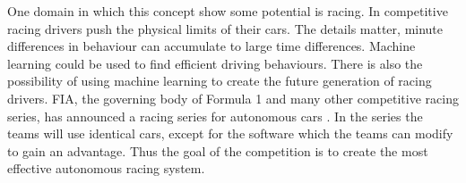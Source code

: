 One domain in which this concept show some potential is racing. In competitive racing drivers push the physical limits of their cars. The details matter, minute differences in behaviour can accumulate to large time differences. Machine learning could be used to find efficient driving behaviours. There is also the possibility of using machine learning to create the future generation of racing drivers. FIA, the governing body of Formula 1 and many other competitive racing series, has announced a racing series for autonomous cars \cite{roborace}. In the series the teams will use identical cars, except for the software which the teams can modify to gain an advantage. Thus the goal of the competition is to create the most effective autonomous racing system. 





